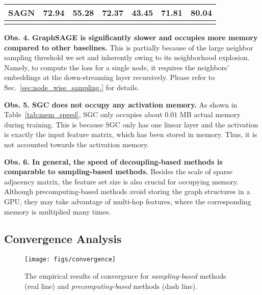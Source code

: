 \message{ !name(main.tex)}\documentclass{article}
\begin{document}
\begin{table}[!ht]
{\begin{tabular}{ccccccc}
			SAGN                                                           & 72.94                                                   & 55.28                                                             & 72.37                                                  & 43.45                                                             & 71.81                                                  & 80.04                                                             \\
			\hline
			                                                               &                                                         &                                                                   &                                                        &                                                                   &                                                        &
		\end{tabular}}
	\vspace{-5mm}
\end{table}

\textbf{Obs. 4. GraphSAGE is significantly slower and occupies more memory compared to other baselines.} This is partially because of the large neighbor sampling threshold we set and inherently owing to its neighborhood explosion. Namely, to compute the loss for a single node, it requires the neighbors' embeddings at the down-streaming layer recursively. Please refer to Sec.~\ref{sec:node_wise_sampling.} for details.

\textbf{Obs. 5. SGC does not occupy any activation memory.} As shown in Table~\ref{tab:mem_speed}, SGC only occupies about $0.01$ MB actual memory during training. This is because SGC only has one linear layer and the activation is exactly the input feature matrix, which has been stored in memory. Thus, it is not accounted towards the activation memory.

\textbf{Obs. 6. In general, the speed of decoupling-based methods is comparable to sampling-based methods.} Besides the scale of sparse adjacency matrix, the feature set size is also crucial for occupying memory. Although precomputing-based methods avoid storing the graph structures in a GPU, they may take advantage of multi-hop features, where the corresponding memory is multiplied many times.

\vspace{-2mm}
\subsection{Convergence Analysis} \label{sec:convergence_analysis}
\vspace{-2mm}
\begin{figure}[!ht]
	\begin{center}
		\texttt{[image: figs/convergence]}
	\end{center}
	\vspace{-2mm}
	\caption{The empirical results of convergence for \textit{sampling-based} methods (real line) and \textit{precomputing-based} methods (dash line).}
	\label{fig:convergence_analysis}
	\vspace{-3mm}
\end{figure}
\end{document}
